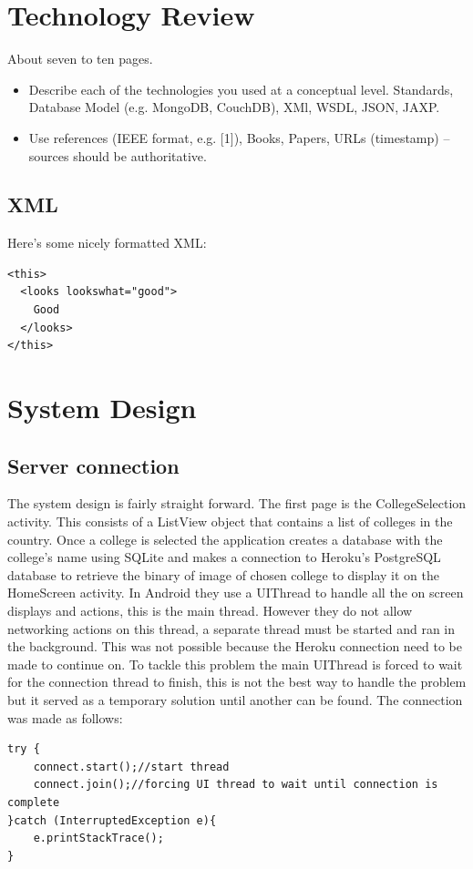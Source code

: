 \chapter{Technology Review}
About seven to ten pages.
\begin{itemize}
\item Describe each of the technologies you used at a conceptual level. Standards, Database Model (e.g. MongoDB, CouchDB), XMl, WSDL, JSON, JAXP.
\item Use references (IEEE format, e.g. [1]), Books, Papers, URLs (timestamp) – sources should be authoritative. 
\end{itemize}

\section{XML}
Here's some nicely formatted XML:
\begin{verbatim}
<this>
  <looks lookswhat="good">
    Good
  </looks>
</this>
\end{verbatim}

\chapter{System Design}
\section{Server connection}
The system design is fairly straight forward. The first page is the CollegeSelection activity. This consists of a ListView object that contains a list of colleges in the country. Once a college is selected the application creates a database with the college's name using SQLite and makes a connection to Heroku's PostgreSQL database to retrieve the binary of image of chosen college to display it on the HomeScreen activity. In Android they use a UIThread to handle all the on screen displays and actions, this is the main thread. However they do not allow networking actions on this thread, a separate thread must be started and ran in the background. This was not possible because the Heroku connection need to be made to continue on. To tackle this problem the main UIThread is forced to wait for the connection thread to finish, this is not the best way to handle the problem but it served as a temporary solution until another can be found. The connection was made as follows:

\begin{verbatim}
try {
	connect.start();//start thread
	connect.join();//forcing UI thread to wait until connection is complete
}catch (InterruptedException e){
	e.printStackTrace();
}
\end{verbatim}

